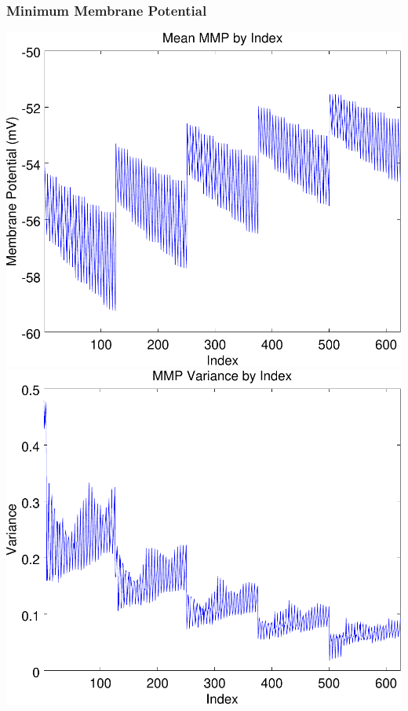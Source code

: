 \documentclass{beamer}
\theoremstyle{plain}
\theoremstyle{definition}
\begin{document}
\begin{frame}\frametitle{Minimum Membrane Potential}
  \begin{center}
    \includegraphics[scale=.32]{MMP.pdf}%
    \includegraphics[scale=.32]{MMPVariance.pdf}
  \end{center}
\end{frame}
\end{document}

